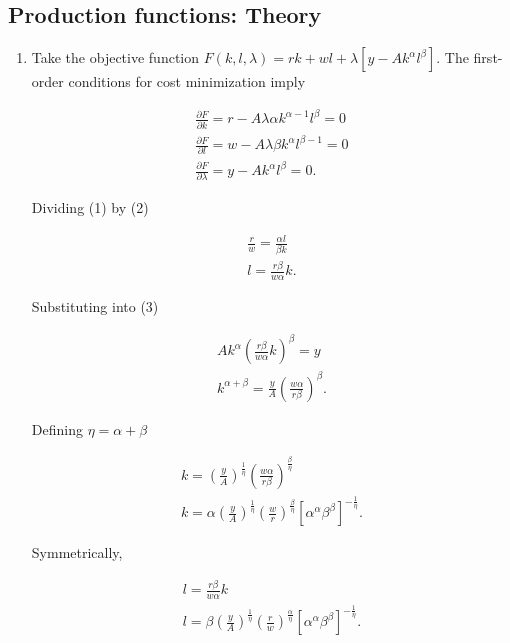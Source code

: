 \documentclass{article}
\begin{document}
\subsection*{Production functions: Theory}

\begin{enumerate}

	\item

	Take the objective function $F(k,l, \lambda) = rk + wl + \lambda[y - Ak^\alpha l^\beta]$. The first-order conditions for cost minimization imply

	\begin{gather}
	\frac{\partial F}{\partial k} = r - A \lambda \alpha k^{\alpha - 1}l^\beta = 0 \\
	\frac{\partial F}{\partial l} = w - A \lambda \beta k^\alpha l^{\beta - 1} = 0 \\
	\frac{\partial F}{\partial \lambda} = y - Ak^\alpha l^\beta = 0.
	\end{gather}

	Dividing (1) by (2)

	\begin{gather*}
	\frac{r}{w} = \frac{\alpha l}{\beta k} \\
	l = \frac{r \beta}{w \alpha} k.
	\end{gather*}

	Substituting into (3)

	\begin{gather*}
	Ak^\alpha \left( \frac{r \beta}{w \alpha} k \right)^\beta = y \\
	k^{\alpha + \beta} = \frac{y}{A} \left( \frac{w \alpha}{r \beta} \right)^\beta.
	\end{gather*}

	Defining $\eta = \alpha + \beta$

	\begin{gather*}
	k = \left( \frac{y}{A} \right)^{\frac{1}{\eta}} \left( \frac{w \alpha}{r \beta} \right)^{\frac{\beta}{\eta}} \\
	k = \alpha \left( \frac{y}{A} \right)^{\frac{1}{\eta}} \left( \frac{w}{r} \right)^{\frac{\beta}{\eta}} [\alpha^\alpha \beta^\beta]^{- \frac{1}{\eta}}.
	\end{gather*}

	Symmetrically,

	\begin{gather*}
	l = \frac{r \beta}{w \alpha} k \\
	l = \beta \left( \frac{y}{A} \right)^{\frac{1}{\eta}} \left( \frac{r}{w} \right)^{\frac{\alpha}{\eta}} [\alpha^\alpha \beta^\beta]^{- \frac{1}{\eta}}.
	\end{gather*}


\end{enumerate}
\end{document}
